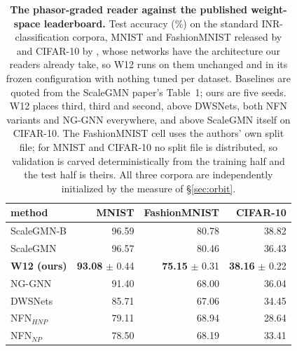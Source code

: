 \begin{table}[t]
\centering\small
\caption{\textbf{The phasor-graded reader against the published weight-space leaderboard.} Test accuracy (\%) on the standard INR-classification corpora, MNIST and FashionMNIST released by \citet{navon2023dws} and CIFAR-10 by \citet{zhou2023nfn}, whose networks have the architecture our readers already take, so W12 runs on them unchanged and in its frozen configuration with nothing tuned per dataset. Baselines are quoted from the ScaleGMN paper's Table~1; ours are five seeds. W12 places third, third and second, above DWSNets, both NFN variants and NG-GNN everywhere, and above ScaleGMN itself on CIFAR-10. The FashionMNIST cell uses the authors' own split file; for MNIST and CIFAR-10 no split file is distributed, so validation is carved deterministically from the training half and the test half is theirs. All three corpora are independently initialized by the measure of \S\ref{sec:orbit}.}
\label{tab:bench}
\begin{tabular}{@{}lrrr@{}}
\toprule
method & MNIST & FashionMNIST & CIFAR-10 \\
\midrule
ScaleGMN-B \citep{kalogeropoulos2024scalegmn} & 96.59 & 80.78 & 38.82 \\
ScaleGMN \citep{kalogeropoulos2024scalegmn} & 96.57 & 80.46 & 36.43 \\
\textbf{W12 (ours)} & \textbf{93.08} $\pm$ 0.44 & \textbf{75.15} $\pm$ 0.31 & \textbf{38.16} $\pm$ 0.22 \\
NG-GNN \citep{kofinas2024graph} & 91.40 & 68.00 & 36.04 \\
DWSNets \citep{navon2023dws} & 85.71 & 67.06 & 34.45 \\
NFN$_{HNP}$ \citep{zhou2023nfn} & 79.11 & 68.94 & 28.64 \\
NFN$_{NP}$ \citep{zhou2023nfn} & 78.50 & 68.19 & 33.41 \\
\bottomrule
\end{tabular}
\end{table}
